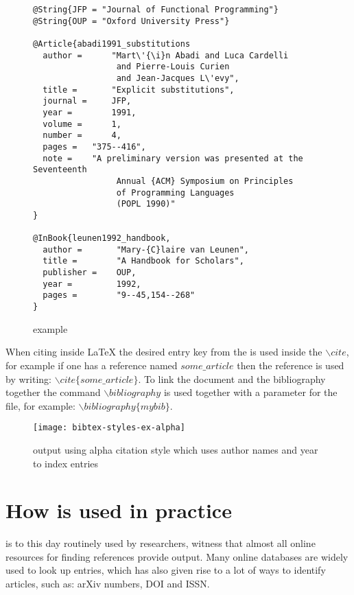 \begin{figure}
  \centering
  \begin{small}
\begin{verbatim}
@String{JFP = "Journal of Functional Programming"}
@String{OUP = "Oxford University Press"}

@Article{abadi1991_substitutions
  author =      "Mart\'{\i}n Abadi and Luca Cardelli
                 and Pierre-Louis Curien
                 and Jean-Jacques L\'evy",
  title =       "Explicit substitutions",
  journal =     JFP,
  year =        1991,
  volume =      1,
  number =      4,
  pages =	"375--416",
  note =	"A preliminary version was presented at the Seventeenth
                 Annual {ACM} Symposium on Principles
                 of Programming Languages
                 (POPL 1990)"
}

@InBook{leunen1992_handbook,
  author =       "Mary-{C}laire van Leunen",
  title =        "A Handbook for Scholars",
  publisher =    OUP,
  year =         1992,
  pages =        "9--45,154--268"
}
\end{verbatim}
  \end{small}
  \caption{{\bibtex} example}
\label{fig:bibtex_example}
\end{figure}

When citing inside {\LaTeX} the desired entry key from the {\bibtex}
is used inside the ${\backslash}cite$, for example if one has a
reference named $some\_article$ then the reference is used by writing:
${\backslash}cite\{some\_article\}$.  To link the document and the
bibliography together the command ${\backslash}bibliography$ is used
together with a parameter for the {\bibtex} file, for example:
${\backslash}bibliography\{mybib\}$.

\begin{figure}
  \centering
  \texttt{[image: bibtex-styles-ex-alpha]}
  \caption{{\bibtex} output using alpha citation style which uses
    author names and year to index entries}
\label{fig:bibtex_example_alpha}
\end{figure}


\section{How {\bibtex} is used in practice}
\label{sec:how_bibtex_is_used_today}

{\bibtex} is to this day routinely used by researchers, witness that
almost all online resources for finding references provide {\bibtex}
output.  Many online databases are widely used to look up entries,
which has also given rise to a lot of ways to identify articles, such
as: arXiv numbers, DOI and ISSN.

